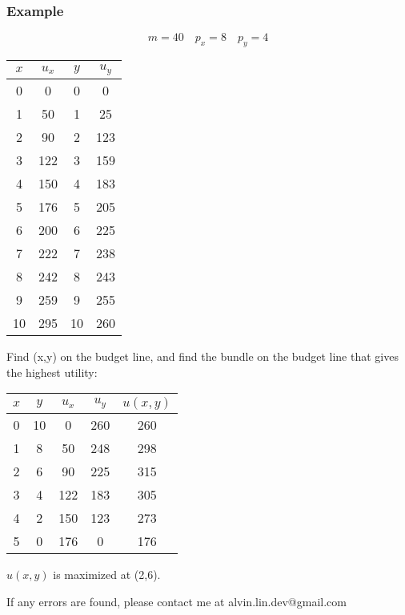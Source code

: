 \documentclass[letterpaper, 12pt]{article}
\begin{document}
\subsubsection{Example}
\[ m = 40 \quad p_{x} = 8 \quad p_{y} = 4 \]
\begin{center}
  \begin{tabular}{|c|c|c|c|}
    \hline
    \( x \) & \( u_{x} \) & \(y \) & \( u_{y} \) \\ \hline
    0       & 0           & 0      & 0           \\ \hline
    1       & 50          & 1      & 25          \\ \hline
    2       & 90          & 2      & 123         \\ \hline
    3       & 122         & 3      & 159         \\ \hline
    4       & 150         & 4      & 183         \\ \hline
    5       & 176         & 5      & 205         \\ \hline
    6       & 200         & 6      & 225         \\ \hline
    7       & 222         & 7      & 238         \\ \hline
    8       & 242         & 8      & 243         \\ \hline
    9       & 259         & 9      & 255         \\ \hline
    10      & 295         & 10     & 260         \\ \hline
  \end{tabular}
\end{center}
Find (x,y) on the budget line, and find the bundle on the budget line that
gives the highest utility:
\begin{center}
  \begin{tabular}{|c|c|c|c|c|}
    \hline
    \( x \) & \( y \) & \( u_{x} \) & \( u_{y} \) & \( u(x,y) \) \\ \hline
    0       & 10      & 0           & 260         & 260          \\ \hline
    1       & 8       & 50          & 248         & 298          \\ \hline
    2       & 6       & 90          & 225         & 315          \\ \hline
    3       & 4       & 122         & 183         & 305          \\ \hline
    4       & 2       & 150         & 123         & 273          \\ \hline
    5       & 0       & 176         & 0           & 176          \\ \hline
  \end{tabular}
\end{center}
\( u(x,y) \) is maximized at (2,6).

\begin{center}
  If any errors are found, please contact me at alvin.lin.dev@gmail.com
\end{center}
\end{document}
